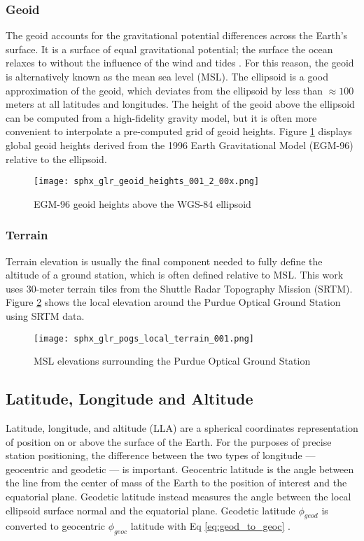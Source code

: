 \subsubsection{Geoid}

The geoid accounts for the gravitational potential differences across the Earth's surface. It is a surface of equal gravitational potential; the surface the ocean relaxes to without the influence of the wind and tides \cite{vallado4ed}. For this reason, the geoid is alternatively known as the mean sea level (MSL). The ellipsoid is a good approximation of the geoid, which deviates from the ellipsoid by less than $\approx 100$ meters at all latitudes and longitudes. The height of the geoid above the ellipsoid can be computed from a high-fidelity gravity model, but it is often more convenient to interpolate a pre-computed grid of geoid heights. Figure \ref{fig:geoid_shape} displays global geoid heights derived from the 1996 Earth Gravitational Model (EGM-96) relative to the ellipsoid.

\begin{figure}[ht]
  \centering
  \texttt{[image: sphx\_glr\_geoid\_heights\_001\_2\_00x.png]}
  \caption{EGM-96 geoid heights above the WGS-84 ellipsoid}
  \label{fig:geoid_shape}
\end{figure}

\subsubsection{Terrain}

Terrain elevation is usually the final component needed to fully define the altitude of a ground station, which is often defined relative to MSL. This work uses $30$-meter terrain tiles from the Shuttle Radar Topography Mission (SRTM). Figure \ref{fig:pogs_terrain} shows the local elevation around the Purdue Optical Ground Station using SRTM data.

\begin{figure}[ht]
  \centering
  \texttt{[image: sphx\_glr\_pogs\_local\_terrain\_001.png]}
  \caption{MSL elevations surrounding the Purdue Optical Ground Station}
  \label{fig:pogs_terrain}
\end{figure}

\subsection{Latitude, Longitude and Altitude}

Latitude, longitude, and altitude (LLA) are a spherical coordinates representation of position on or above the surface of the Earth. For the purposes of precise station positioning, the difference between the two types of longitude --- geocentric and geodetic --- is important. Geocentric latitude is the angle between the line from the center of mass of the Earth to the position of interest and the equatorial plane. Geodetic latitude instead measures the angle between the local ellipsoid surface normal and the equatorial plane. Geodetic latitude $\phi_{geod}$ is converted to geocentric $\phi_{geoc}$ latitude with Eq \ref{eq:geod_to_geoc} \cite{frueh2019notes}.

